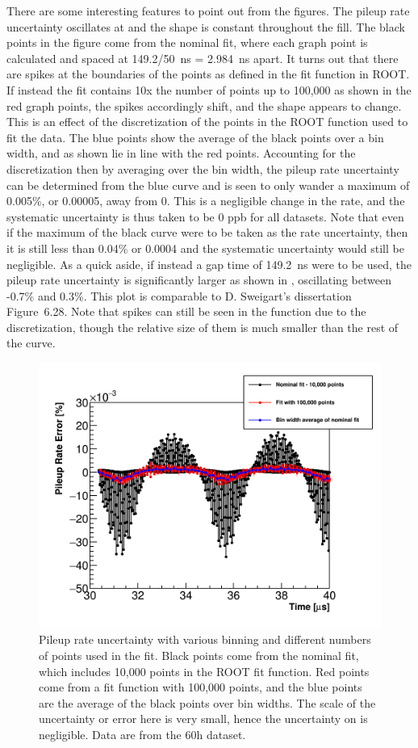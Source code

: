 There are some interesting features to point out from the figures. The pileup rate uncertainty oscillates at \wa and the shape is constant throughout the fill. The black points in the figure come from the nominal fit, where each graph point is calculated and spaced at 149.2/50~ns = 2.984~ns apart. It turns out that there are spikes at the boundaries of the points as defined in the fit function in ROOT. If instead the fit contains 10x the number of points up to 100,000 as shown in the red graph points, the spikes accordingly shift, and the shape appears to change. This is an effect of the discretization of the points in the ROOT function used to fit the data. The blue points show the average of the black points over a bin width, and as shown lie in line with the red points. Accounting for the discretization then by averaging over the bin width, the pileup rate uncertainty can be determined from the blue curve and is seen to only wander a maximum of 0.005\%, or 0.00005, away from 0. This is a negligible change in the rate, and the systematic uncertainty is thus taken to be 0 ppb for all datasets. Note that even if the maximum of the black curve were to be taken as the rate uncertainty, then it is still less than 0.04\% or 0.0004 and the systematic uncertainty would still be negligible. As a quick aside, if instead a gap time of \SI{149.2}{\ns} were to be used, the pileup rate uncertainty is significantly larger as shown in , oscillating between -0.7\% and 0.3\%. This plot is comparable to D. Sweigart's dissertation Figure~6.28. Note that spikes can still be seen in the function due to the discretization, though the relative size of them is much smaller than the rest of the curve.




\begin{figure}
    \centering
    \includegraphics[width=.6\textwidth]{PileupRateError}
    \caption[]{Pileup rate uncertainty with various binning and different numbers of points used in the fit. Black points come from the nominal fit, which includes 10,000 points in the ROOT fit function. Red points come from a fit function with 100,000 points, and the blue points are the average of the black points over bin widths. The scale of the uncertainty or error here is very small, hence the uncertainty on \R is negligible. Data are from the 60h dataset.}
    \label{fig:pileupRateError}
\end{figure}

